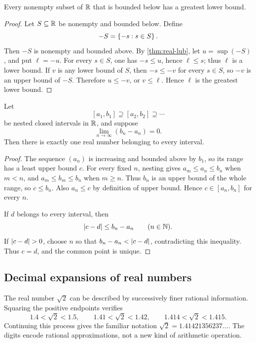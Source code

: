 \begin{theorem}
\label{thm:real-glb}
Every nonempty subset of $\mathbb{R}$ that is bounded below has a greatest lower bound.
\end{theorem}
\begin{proof}
Let $S\subseteq\mathbb{R}$ be nonempty and bounded below. Define
\[
-S=\left\{-s:s\in S\right\}.
\]
Then $-S$ is nonempty and bounded above. By \cref{thm:real-lub}, let $u=\sup(-S)$, and put $\ell=-u$. For every $s\in S$, one has $-s\leq u$, hence $\ell\leq s$; thus $\ell$ is a lower bound. If $v$ is any lower bound of $S$, then $-s\leq-v$ for every $s\in S$, so $-v$ is an upper bound of $-S$. Therefore $u\leq-v$, or $v\leq\ell$. Hence $\ell$ is the greatest lower bound.
\end{proof}

\begin{theorem}
\label{thm:nested-interval}
Let
\[
[a_1,b_1]\supseteq[a_2,b_2]\supseteq\cdots
\]
be nested closed intervals in $\mathbb{R}$, and suppose
\[
\lim_{n\to\infty}(b_n-a_n)=0.
\]
Then there is exactly one real number belonging to every interval.
\end{theorem}
\begin{proof}
The sequence $(a_n)$ is increasing and bounded above by $b_1$, so its range has a least upper bound $c$. For every fixed $n$, nesting gives $a_m\leq a_n\leq b_n$ when $m<n$, and $a_m\leq b_m\leq b_n$ when $m\geq n$. Thus $b_n$ is an upper bound of the whole range, so $c\leq b_n$. Also $a_n\leq c$ by definition of upper bound. Hence $c\in[a_n,b_n]$ for every $n$.

If $d$ belongs to every interval, then
\[
\lvert c-d\rvert\leq b_n-a_n\qquad(n\in\mathbb{N}).
\]
If $\lvert c-d\rvert>0$, choose $n$ so that $b_n-a_n<\lvert c-d\rvert$,
contradicting this inequality. Thus $c=d$, and the common point is unique.
\end{proof}

\subsection{Decimal expansions of real numbers}
\label{sec:decimal-expansions}
The real number $\sqrt2$ can be described by successively finer rational
information. Squaring the positive endpoints verifies
\[
1.4<\sqrt2<1.5,\qquad
1.41<\sqrt2<1.42,\qquad
1.414<\sqrt2<1.415.
\]
Continuing this process gives the familiar notation
$\sqrt2=1.41421356237\ldots$. The digits encode rational approximations,
not a new kind of arithmetic operation.

